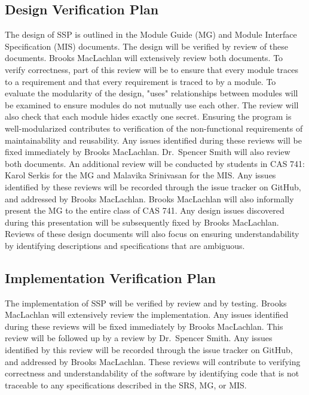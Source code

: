 \documentclass[12pt, titlepage]{article}
\newcommand{\progname}{SSP}
\begin{document}
\subsection{Design Verification Plan}

\noindent The design of \progname{} is outlined in the Module Guide (MG) and 
Module Interface Specification (MIS) documents. The design will be verified by 
review of these documents. Brooks MacLachlan will extensively review both 
documents. To verify correctness, part of this review will be to ensure that 
every module traces to a requirement and that every requirement is traced to by 
a module. To evaluate the modularity of the design, "uses"  relationships 
between modules will be examined to ensure modules do not mutually use each 
other. The review will also check that each module hides exactly one secret. 
Ensuring the program is well-modularized contributes to verification of the 
non-functional requirements of maintainability and reusability. Any issues 
identified during these reviews will be fixed immediately by Brooks MacLachlan. 
Dr.~Spencer Smith will also review both documents. An additional review will be 
conducted by students in CAS 741: Karol Serkis for the MG and Malavika 
Srinivasan for the MIS. Any issues identified by these reviews will be recorded 
through the issue tracker on GitHub, and addressed by Brooks 
MacLachlan. Brooks MacLachlan will also informally present the MG to the entire 
class of CAS 741. Any design issues discovered during this presentation will be 
subsequently fixed by Brooks MacLachlan. Reviews of these design documents will 
also focus on ensuring understandability by identifying descriptions and 
specifications that are ambiguous.

\subsection{Implementation Verification Plan} \label{sec_ImpPlan}

\noindent The implementation of \progname{} will be verified by review and by 
testing. Brooks MacLachlan will extensively review the implementation. Any 
issues identified during these reviews will be fixed immediately by Brooks 
MacLachlan. This review will be followed up by a review by Dr.~Spencer Smith. 
Any  issues identified by this review will be recorded through the issue 
tracker on GitHub, and addressed by Brooks MacLachlan. These reviews will 
contribute to verifying correctness and understandability of the software by 
identifying code that is not traceable to any specifications described in the 
SRS, MG, or MIS.
\newline
\end{document}
